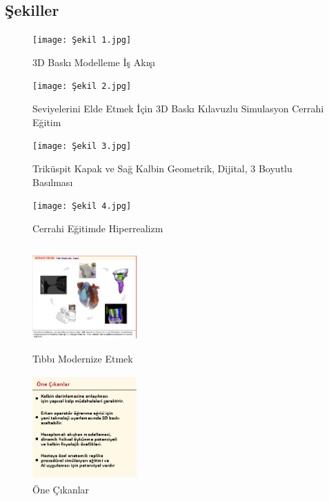 \documentclass{IEEEtran}
\begin{document}




\subsection{Şekiller}
\begin{figure}[!t]
\caption{3D Baskı Modelleme İş Akışı}
\centerline{\texttt{[image: Şekil 1.jpg]}}
\label{fig1}
\end{figure}

\begin{figure}[!t]
\caption{Seviyelerini Elde Etmek İçin 3D Baskı Kılavuzlu Simulasyon Cerrahi Eğitim}
\centerline{\texttt{[image: Şekil 2.jpg]}}
\label{fig2}
\end{figure}

\begin{figure}[!t]
\caption{Triküspit Kapak ve Sağ Kalbin Geometrik, Dijital, 3 Boyutlu Basılması}
\centerline{\texttt{[image: Şekil 3.jpg]}}
\label{fig3}
\end{figure}

\begin{figure}[!t]
\caption{Cerrahi Eğitimde Hiperrealizm}
\centerline{\texttt{[image: Şekil 4.jpg]}}
\label{fig4}
\end{figure}

\begin{figure}[!t]
\caption{Tıbbı Modernize Etmek}
\centerline{\includegraphics[width=4cm,height=4cm]{Merkezi Resim.png}}
\label{figm}
\end{figure}

\begin{figure}[!t]
\caption{Öne Çıkanlar}
\centerline{\includegraphics[width=4cm,height=4cm]{Öne Çıkanlar.png}}
\label{figö}
\end{figure}
\end{document}
